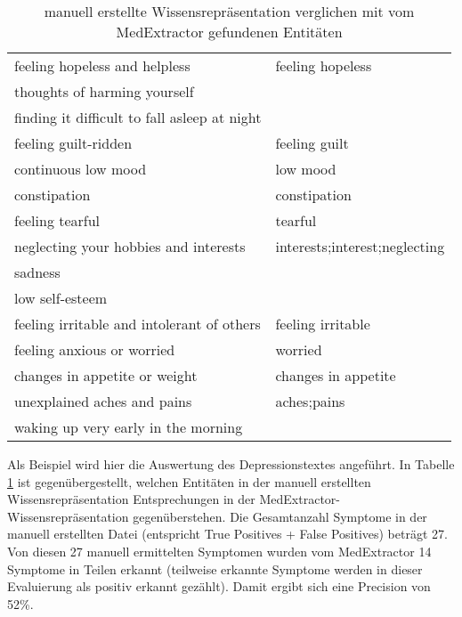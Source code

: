 \begin{table}
\begin{center}
\begin{tabular}{ll}
                     feeling hopeless and helpless &              feeling hopeless \\
                      thoughts of harming yourself &                               \\
      finding it difficult to fall asleep at night &                               \\
                              feeling guilt-ridden &                 feeling guilt \\
                               continuous low mood &                      low mood \\
                                      constipation &                  constipation \\
                                   feeling tearful &                       tearful \\
             neglecting your hobbies and interests & interests;interest;neglecting \\
                                           sadness &                               \\
                                   low self-esteem &                               \\
        feeling irritable and intolerant of others &             feeling irritable \\
                        feeling anxious or worried &                       worried \\
                     changes in appetite or weight &           changes in appetite \\
                       unexplained aches and pains &                   aches;pains \\
               waking up very early in the morning &                               \\
\bottomrule
\end{tabular}
\caption{manuell erstellte Wissensrepräsentation verglichen mit vom MedExtractor gefundenen Entitäten}
\label{tab:vergleich_manuell_medextractor}
\end{center}
\end{table}

Als Beispiel wird hier die Auswertung des Depressionstextes angeführt. In Tabelle \ref{tab:vergleich_manuell_medextractor} ist gegenübergestellt, welchen Entitäten in der manuell erstellten Wissensrepräsentation Entsprechungen in der MedExtractor-Wissens\-reprä\-sentation gegenüberstehen. Die Gesamtanzahl Symptome in der manuell erstellten Datei (entspricht True Positives + False Positives) beträgt 27. Von diesen 27 manuell ermittelten Symptomen wurden vom MedExtractor 14 Symptome in Teilen erkannt (teilweise erkannte Symptome werden in dieser Evaluierung als positiv erkannt gezählt). Damit ergibt sich eine Precision von 52\%.



